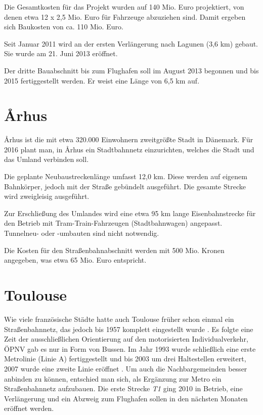 Die Gesamtkosten für das Projekt wurden auf 140 Mio. Euro projektiert, von denen
etwa 12 x 2,5 Mio. Euro für Fahrzeuge abzuziehen sind. Damit ergeben sich
Baukosten von ca. 110 Mio. Euro.

Seit Januar 2011 wird an der ersten Verlängerung nach Lagunen (3,6 km)
gebaut. Sie wurde am 21. Juni 2013 eröffnet.

Der dritte Bauabschnitt bis zum Flughafen soll im August 2013 begonnen und bis
2015 fertiggestellt werden. Er weist eine Länge von 6,5 km auf.

\section{Århus}

Århus ist die mit etwa 320.000 Einwohnern zweitgrößte Stadt in Dänemark. Für 2016
plant man, in Århus ein Stadtbahnnetz einzurichten, welches die Stadt und das
Umland verbinden soll.

Die geplante Neubaustreckenlänge umfasst 12,0 km. Diese werden auf eigenem
Bahnkörper, jedoch mit der Straße gebündelt ausgeführt. Die gesamte Strecke wird
zweigleisig ausgeführt.

Zur Erschließung des Umlandes wird eine etwa 95 km lange Eisenbahnstrecke für
den Betrieb mit Tram-Train-Fahrzeugen (Stadtbahnwagen) angepasst. Tunnelneu-
oder -umbauten sind nicht notwendig.

Die Kosten für den Straßenbahnabschnitt werden mit 500 Mio. Kronen angegeben,
was etwa 65 Mio.  Euro entspricht.

\section{Toulouse}

Wie viele französische Städte hatte auch Toulouse früher schon einmal ein Straßenbahnnetz, das jedoch bis 1957 komplett eingestellt wurde \cite{tlsesv}.
Es folgte eine Zeit der ausschließlichen Orientierung auf den motorisierten Individualverkehr, ÖPNV gab es nur in Form von Bussen.
Im Jahr 1993 wurde schließlich eine erste Metrolinie (Linie A) fertiggestellt und bis 2003 um drei Haltestellen erweitert, 2007 wurde eine zweite Linie eröffnet \cite{lafage}.
Um auch die Nachbargemeinden besser anbinden zu können, entschied man sich, als Ergänzung zur Metro ein Straßenbahnnetz aufzubauen. Die erste Strecke \textit{T1} ging 2010 in Betrieb, eine Verlängerung und ein Abzweig zum Flughafen sollen in den nächsten Monaten eröffnet werden.

